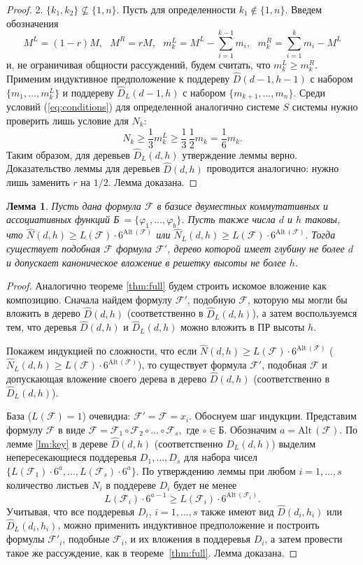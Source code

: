 \documentclass[12pt, a4paper]{article}
\theoremstyle{plain}
\newtheorem{lemma}{Лемма}
\theoremstyle{definition}
\theoremstyle{definition}
\newcommand{\D}{\mathbb{D}}
\newcommand{\Sum}{\displaystyle\sum\limits}
\renewcommand{\ge}{\geqslant}
\renewcommand{\hat}{\widehat}
\renewcommand{\phi}{\varphi}
\newcommand{\Alt}{\mathrm{Alt}\,}
\newcommand{\N}{\hat{N}}
\renewcommand{\D}{\widehat{D}}
\newcommand{\F}{\mathscr{F}}
\begin{document}
\begin{proof}
2. $\{k_1,k_2\} \not \subseteq \{1,n\}$. Пусть для определенности $k_1 \notin \{1,n\}$. Введем обозначения
\[
M^L = (1-r)M,~~~ M^R = r M,~~~ m_k^L = M^L - \Sum_{i=1}^{k-1}m_i,~~~m_k^R = \Sum_{i=1}^{k}m_i - M^L
\] 
и, не ограничивая общности рассуждений, будем считать, что $m_k^L \ge m_k^R$. Применим индуктивное предположение к поддереву $\hat{D}(d-1,h-1)$ с набором $\{m_1, \dots, m_k^L\}$ и поддереву $\hat{D}_L(d-1,h)$ с набором $\{m_{k+1}, \dots, m_n\}$.
Среди условий (\ref{eq:conditions}) для определенной аналогично системе $S$ системы нужно проверить лишь условие для $N_k$:
\[
	N_k \ge \frac{1}{3} m_k^L \ge \frac{1}{3}\, \frac{1}{2}m_k = \frac{1}{6}m_k.
\]
Таким образом, для деревьев $\hat{D}_L(d,h)$ утверждение леммы верно. Доказательство леммы для деревьев $\hat{D}(d,h)$ проводится аналогично: нужно лишь заменить $r$ на $1/2$.
Лемма доказана.
\end{proof}

\begin{lemma}
\label{lm:formula}
Пусть дана формула $\F$ в базисе двуместных коммутативных и ассоциативных
функций \textup{Б}$~ = \{\phi_1, \dots, \phi_b \}$. 
Пусть также числа $d$ и $h$ таковы\textup{,} что 
$
	\N(d,h) \ge L(\F) \cdot 6^{\Alt(\F)}
$ или $
	\N_L(d,h) \ge L(\F) \cdot 6^{\Alt(\F)}.
$
Тогда существует подобная $\F$ формула $\F'$\textup{,} дерево которой имеет глубину не более 
$d$ и допускает каноническое вложение в решетку 
высоты не более $h$.
\end{lemma}

\begin{proof}
Аналогично теореме \ref{thm:full} будем строить искомое вложение 
как композицию. Сначала найдем формулу $\F'$, подобную $\F$, которую мы могли бы вложить в
дерево $\widehat{D}(d,h)$ (соответственно в $\widehat{D}_L(d,h)$), а затем воспользуемся тем, что деревья 
$\widehat{D}(d,h)$ и $\widehat{D}_L(d,h)$ можно вложить в ПР 
высоты $h$.

Покажем индукцией по сложности, что если $\N(d,h) \ge L(\F) \cdot 6^{\Alt(\F)}$ ($\N_L(d,h) \ge L(\F) \cdot 6^{\Alt(\F)}$), то существует формула $\F'$, подобная $\F$ и допускающая вложение своего дерева 
в дерево $\D(d,h)$ (соответственно в $\D_L(d,h)$).

База ($L(\F) = 1$) очевидна: $\F' = \F = x_i$.
Обоснуем шаг индукции.
Представим формулу $\F$ в виде
$
	\F = \F_1 \circ \F_2 \circ \dots \circ \F_s,
$
где $\circ \in Б$. 
Обозначим $a = \Alt(\F)$.
По лемме \ref{lm:key} в дереве $\D(d,h)$ (соответственно $\D_L(d,h)$) выделим непересекающиеся поддеревья $D_1, \dots, D_s$ для набора чисел $\{L(\F_1) \cdot 6^a, \dots, L(\F_s) \cdot 6^a\}$.
По утверждению леммы при любом $i=1,\dots,s$ количество листьев $N_i$
в поддереве $D_i$ будет не менее 
\[
	L(\F_i) \cdot 6^{a-1} \ge L(\F_i) \cdot 6^{\Alt(\F_i)}.
\] 
Учитывая, что все поддеревья $D_i$, $i=1,\dots,s$ также имеют вид $\D(d_i, h_i)$ или
$\D_L(d_i,h_i)$, можно применить индуктивное предположение и построить формулы $\F'_i$, подобные $\F_i$, и их вложения в поддеревья $D_i$, а затем
провести такое же рассуждение, как в теореме~\ref{thm:full}.
Лемма доказана.
\end{proof}
\smallskip
\end{document}

